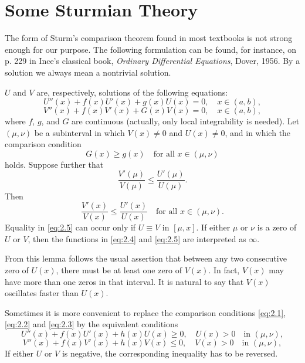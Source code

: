 \section{Some Sturmian Theory}

The form of Sturm's comparison theorem found in most textbooks is not strong
enough for our purpose. The following formulation can be found, for instance,
on p. 229 in Ince's classical book, \emph{Ordinary Differential Equations}, Dover, 1956.
By a solution we always mean a nontrivial solution.

\begin{lemma}[Sturm]\label{lemma:1}
  $U$ and $V$ are, respectively, solutions of the following equations:
  \begin{equation}\label{eq:2.1}
    U''(x) + f(x)U'(x) + g(x)U(x) = 0,\quad x\in (a,b),
  \end{equation}
  \begin{equation}\label{eq:2.2}
    V''(x) + f(x)V'(x) + G(x)V(x) = 0,\quad x\in (a,b),
  \end{equation}
  where $f$, $g$, and $G$ are continuous (actually, only local integrability is needed).
  Let $(\mu,\nu)$ be a subinterval in which $V(x)\neq 0$ and $U(x)\neq 0$,
  and in which the comparison condition
  \begin{equation}\label{eq:2.3}
    G(x) \geq g(x)\quad \text{for all } x\in (\mu,\nu) 
  \end{equation}
  holds. Suppose further that
  \begin{equation}\label{eq:2.4}
    \frac{V'(\mu)}{V(\mu)} \leq \frac{U'(\mu)}{U(\mu)}.
  \end{equation}
  Then
  \begin{equation}\label{eq:2.5}
    \frac{V'(x)}{V(x)} \leq \frac{U'(x)}{U(x)}\quad \text{for all } x\in (\mu,\nu).
  \end{equation}
  Equality in \eqref{eq:2.5} can occur only if $U\equiv V$ in $[\mu, x]$.
  If either $\mu$ or $\nu$ is a zero of $U$ or $V$, then the functions
  in \eqref{eq:2.4} and \eqref{eq:2.5} are interpreted as $\infty$.
\end{lemma}

From this lemma follows the usual assertion that between any two consecutive
zero of $U(x)$, there must be at least one zero of $V(x)$.
In fact, $V(x)$ may have more than one zeros in that interval.
It is natural to say that $V(x)$ oscillates faster than $U(x)$.

Sometimes it is more convenient to replace the comparison conditions \eqref{eq:2.1},
\eqref{eq:2.2} and \eqref{eq:2.3} by the equivalent conditions
\begin{equation}\label{eq:2.1prime}
  U''(x) + f(x)U'(x) + h(x)U(x) \geq 0, \quad U(x)>0 \quad \text{in } (\mu,\nu), \tag{2.1$'$}
\end{equation}
\begin{equation}\label{eq:2.2prime}
  V''(x) + f(x)V'(x) + h(x)V(x) \leq 0, \quad V(x)>0 \quad \text{in } (\mu,\nu), \tag{2.2$'$}
\end{equation}
If either $U$ or $V$ is negative, the corresponding inequality has to be reversed.

